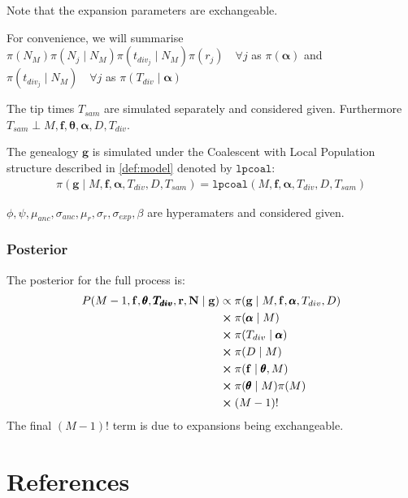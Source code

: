 \documentclass{report}
\theoremstyle{definition}
\begin{document}
Note that the expansion parameters are exchangeable.

For convenience, we will summarise $\pi(N_M)\pi(N_j\mid N_{M})\pi(t_{div_j}\mid N_{M})\pi(r_j) \quad \forall j$ as $\pi(\pmb\alpha)$ and $\pi(t_{div_j}\mid N_{M})\quad \forall j$ as $\pi(T_{div}\mid\pmb\alpha)$

The tip times $T_{sam}$ are simulated separately and considered given. Furthermore $T_{sam} \perp M, \mathbf{f}, \pmb{\theta}, \pmb\alpha, D, T_{div}$.

The genealogy $\mathbf{g}$ is simulated under the Coalescent with Local Population structure described in \ref{def:model} denoted by $\texttt{lpcoal}$:
\begin{gather}
\pi(\mathbf{g}\mid M, \mathbf{f}, \pmb\alpha, T_{div}, D, T_{sam}) = \texttt{lpcoal}(M, \mathbf{f}, \pmb\alpha, T_{div}, D, T_{sam})
\end{gather} 

$\phi, \psi, \mu_{anc}, \sigma_{anc}, \mu_r, \sigma_r, \sigma_{exp}, \beta$ are hyperamaters and considered given.


\subsection{Posterior}
The posterior for the full process is:
\begin{gather}
\begin{aligned}
P(M-1, \mathbf{f}, \pmb{\theta}, \pmb{T_{div}}, \mathbf{r}, \mathbf{N}\mid\mathbf{g})
&\propto \pi(\mathbf{g}\mid M, \mathbf{f}, \pmb\alpha, T_{div}, D)\\
&\cross \pi(\pmb\alpha\mid M)\\
&\cross \pi(T_{div}\mid\pmb\alpha)\\
&\cross \pi(D\mid M)\\
&\cross \pi(\mathbf{f}\mid\pmb{\theta}, M)\\
&\cross\pi(\pmb{\theta}\mid M)\pi(M)\\
&\cross (M-1)!
\end{aligned}
\end{gather}
The final $(M-1)!$ term is due to expansions being exchangeable.

\chapter{References}
\printbibliography
\end{document}
